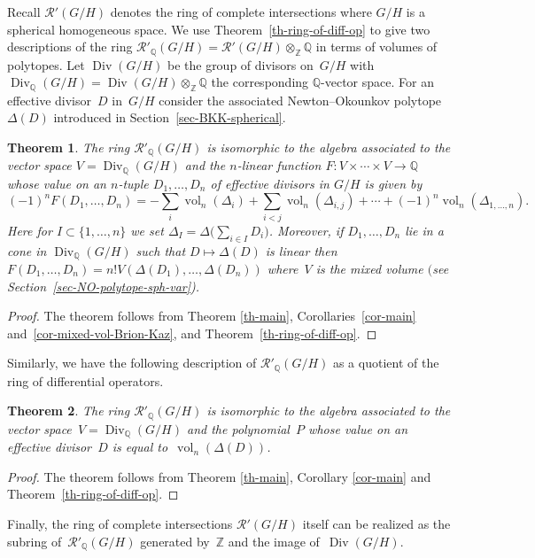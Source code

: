 \documentclass[pdftex]{sigma}
\def \Z{\mathbb{Z}}
\def \Q{\mathbb{Q}}
\def \Div{\operatorname{Div}}
\def \vol{\operatorname{vol}}
\numberwithin{equation}{section}
\newtheorem{Th}{Theorem}[section]
\theoremstyle{definition}
\begin{document}
Recall $\mathcal{R}'(G/H)$ denotes the ring of complete intersections where $G/H$ is a spherical homogeneous space. We use Theorem~\ref{th-ring-of-diff-op} to give two descriptions of the ring $\mathcal{R}'_\Q(G/H) = \mathcal{R}'(G/H) \otimes_{\Z} \Q$ in terms of volumes of polytopes. Let $\Div(G/H)$ be the group of divisors on~$G/H$ with $\Div_\Q(G/H) = \Div(G/H) \otimes_\Z \Q$ the corresponding $\Q$-vector space. For an effective divisor~$D$ in~$G/H$ consider the associated Newton--Okounkov polytope~$\Delta(D)$ introduced in Section~\ref{sec-BKK-spherical}.

\begin{Th}The ring $\mathcal{R}'_\Q(G/H)$ is isomorphic to the algebra associated to the vector space $V = \Div_\Q(G/H)$ and the $n$-linear function $F\colon V \times \cdots \times V \to \Q$ whose value on an $n$-tuple $D_1, \ldots, D_n$ of effective divisors in $G/H$ is given by
$$(-1)^n F(D_1, \ldots, D_n) = - \sum_{i} \vol_n(\Delta_i) + \sum_{i < j} \vol_n(\Delta_{i,j}) + \cdots
+ (-1)^n \vol_n(\Delta_{1, \ldots, n}).$$ Here for $I \subset \{1, \ldots, n\}$ we set $\Delta_I =\Delta\big(\sum_{i \in I} D_i\big)$. Moreover, if $D_1, \ldots, D_n$ lie in a cone in $\Div_\Q(G/H)$ such that $D \mapsto \Delta(D)$ is linear then $F(D_1, \ldots, D_n) = n! V(\Delta(D_1), \ldots, \Delta(D_n))$ where~$V$ is the mixed volume $($see Section~{\rm \ref{sec-NO-polytope-sph-var})}.
\end{Th}
\begin{proof}The theorem follows from Theorem \ref{th-main}, Corollaries~\ref{cor-main} and~\ref{cor-mixed-vol-Brion-Kaz}, and Theo\-rem~\ref{th-ring-of-diff-op}.
\end{proof}

Similarly, we have the following description of $\mathcal{R}'_\Q(G/H)$ as a quotient of the ring of dif\-fe\-rential operators.

\begin{Th} \label{th-ring-complete-intersec-vol-poly}
The ring $\mathcal{R}'_\Q(G/H)$ is isomorphic to the algebra associated to the vector spa\-ce~$V = \Div_\Q(G/H)$ and the polynomial~$P$ whose value on an effective divisor~$D$ is equal to~$\vol_n(\Delta(D))$.
\end{Th}
\begin{proof}The theorem follows from Theorem \ref{th-main}, Corollary \ref{cor-main} and Theorem~\ref{th-ring-of-diff-op}.
\end{proof}

Finally, the ring of complete intersections $\mathcal{R}'(G/H)$ itself can be realized as the subring of~$\mathcal{R}'_\Q(G/H)$ generated by~$\Z$ and the image of~$\Div(G/H)$.
\end{document}
